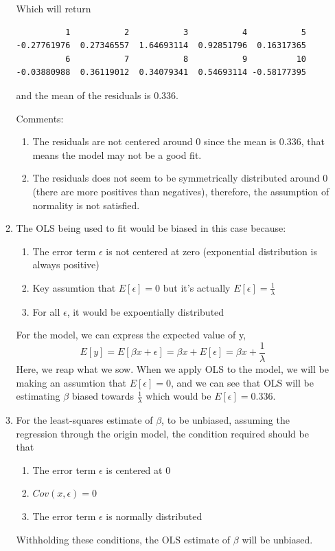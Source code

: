 \documentclass[12pt]{article}
\begin{document}
\begin{enumerate}[1.]
\begin{enumerate}
            Which will return
            \begin{verbatim}
          1           2           3           4           5
-0.27761976  0.27346557  1.64693114  0.92851796  0.16317365
          6           7           8           9          10
-0.03880988  0.36119012  0.34079341  0.54693114 -0.58177395 
            \end{verbatim}

            and the mean of the residuals is $0.336$.

            Comments:

            \begin{enumerate}
                \item The residuals are not centered around 0 since the mean is 0.336, that means the model may not be a good fit.
                \item The residuals does not seem to be symmetrically distributed around 0 (there are more positives than negatives), 
                therefore, the assumption of normality is not satisfied.
            \end{enumerate}

            \item The OLS being used to fit would be biased in this case because:
            \begin{enumerate}
                \item The error term $\epsilon$ is not centered at zero (exponential distribution is always positive)
                \item Key assumtion that $E[\epsilon] = 0$ but it's actually $E[\epsilon] = \frac{1}{\lambda}$
                \item For all $\epsilon$, it would be expoentially distributed
            \end{enumerate}

            For the model, we can express the expected value of y, 
            \[ E[y] = E[\beta x + \epsilon] = \beta x + E[\epsilon]  = \beta x + \frac{1}{\lambda}\]
            Here, we reap what we sow. When we apply OLS to the model, we will be making an assumtion that $E[\epsilon] = 0$,
            and we can see that OLS will be estimating $\beta$ biased towards $\frac{1}{\lambda}$ which would be $E[\epsilon] = 0.336$.
            
            \item For the least-squares estimate of $\beta$, to be unbiased, assuming the regression through the origin model,
            the condition required should be that
            \begin{enumerate}
                \item The error term $\epsilon$ is centered at 0
                \item $Cov(x, \epsilon) = 0$
                \item The error term $\epsilon$ is normally distributed
            \end{enumerate}
            Withholding these conditions, the OLS estimate of $\beta$ will be unbiased.
        \end{enumerate}


\end{enumerate}
\end{document}
